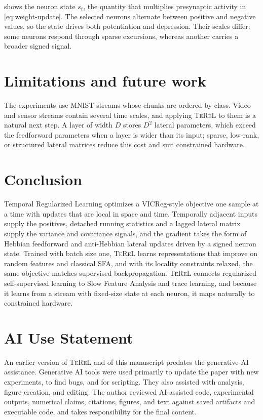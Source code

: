 \documentclass[11pt]{article}
\newcommand{\TeReL}{\textsc{TeReL}}
\begin{document}
 shows the neuron state $s_t$, the quantity that multiplies
presynaptic activity in \cref{eq:weight-update}. The selected neurons
alternate between positive and negative values, so the state drives both
potentiation and depression. Their scales differ: some neurons respond through
sparse excursions, whereas another carries a broader signed signal.

\section{Limitations and future work}

The experiments use MNIST streams whose chunks are ordered by class. Video and
sensor streams contain several time scales, and applying \TeReL{} to them is a
natural next step. A layer of width $D$ stores $D^2$ lateral parameters, which
exceed the feedforward parameters when a layer is wider than its input; sparse, low-rank, or
structured lateral matrices reduce this cost and suit constrained hardware.

\section{Conclusion}

Temporal Regularized Learning optimizes a VICReg-style objective one sample at
a time with updates that are local in space and time. Temporally adjacent
inputs supply the positives, detached running statistics and a lagged lateral
matrix supply the variance and covariance signals, and the gradient takes the
form of Hebbian feedforward and anti-Hebbian lateral updates driven by a signed
neuron state. Trained with batch size one, \TeReL{} learns representations that
improve on random features and classical SFA, and with its locality
constraints relaxed, the same objective matches supervised backpropagation.
\TeReL{} connects regularized self-supervised learning to Slow Feature Analysis
and trace learning, and because it learns from a stream with fixed-size state
at each neuron, it maps naturally to constrained hardware.

\section*{AI Use Statement}

An earlier version of \TeReL{} and of this manuscript predates the
generative-AI assistance. Generative AI tools were used primarily to update
the paper with new experiments, to find bugs, and for scripting. They also
assisted with analysis, figure creation, and editing. The author reviewed AI-assisted code, experimental
outputs, numerical claims, citations, figures, and text against saved
artifacts and executable code, and takes responsibility for the final content.
\end{document}

